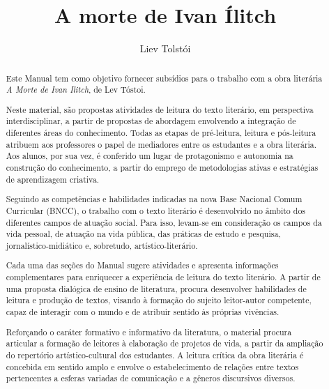 \documentclass{extarticle}
\begin{document}
\newcommand{\AutorLivro}{Liev Tolstói}
\newcommand{\TituloLivro}{A morte de Ivan Ílitch}
\newcommand{\Tema}{Ficção, mistério e fantasia}
\newcommand{\Genero}{Romance}
\newcommand{\imagemCapa}{./images/PNLD0042-01.png}
\newcommand{\issnppub}{---}
\newcommand{\issnepub}{---}
\newcommand{\colaborador}{\textbf{Bruno Gradella e Vicente Castro} é uma pessoa incrível e vai fazer um bom serviço.}


\title{\TituloLivro}
\author{\AutorLivro}
\def\authornotes{\colaborador}

\date{}
\maketitle

\begin{abstract}
Este Manual tem como objetivo fornecer subsídios para o trabalho com a
obra literária \emph{A Morte de Ivan Ilitch}, de Lev Tóstoi.

Neste material, são propostas atividades de leitura do texto literário,
em perspectiva interdisciplinar, a partir de propostas de abordagem
envolvendo a integração de diferentes áreas do conhecimento. Todas as
etapas de pré-leitura, leitura e pós-leitura atribuem aos professores o
papel de mediadores entre os estudantes e a obra literária. Aos alunos,
por sua vez, é conferido um lugar de protagonismo e autonomia na
construção do conhecimento, a partir do emprego de metodologias ativas e
estratégias de aprendizagem criativa.

Seguindo as competências e habilidades indicadas na nova Base Nacional
Comum Curricular (BNCC), o trabalho com o texto literário é desenvolvido
no âmbito dos diferentes campos de atuação social. Para isso, levam-se
em consideração os campos da vida pessoal, de atuação na vida pública,
das práticas de estudo e pesquisa, jornalístico-midiático e, sobretudo,
artístico-literário.

Cada uma das seções do Manual sugere atividades e apresenta informações
complementares para enriquecer a experiência de leitura do texto
literário. A partir de uma proposta dialógica de ensino de literatura,
procura desenvolver habilidades de leitura e produção de textos, visando
à formação do sujeito leitor-autor competente, capaz de interagir com o
mundo e de atribuir sentido às próprias vivências.

Reforçando o caráter formativo e informativo da literatura, o material
procura articular a formação de leitores à elaboração de projetos de
vida, a partir da ampliação do repertório artístico-cultural dos
estudantes. A leitura crítica da obra literária é concebida em sentido
amplo e envolve o estabelecimento de relações entre textos pertencentes
a esferas variadas de comunicação e a gêneros discursivos diversos.


\end{abstract}
\end{document}
